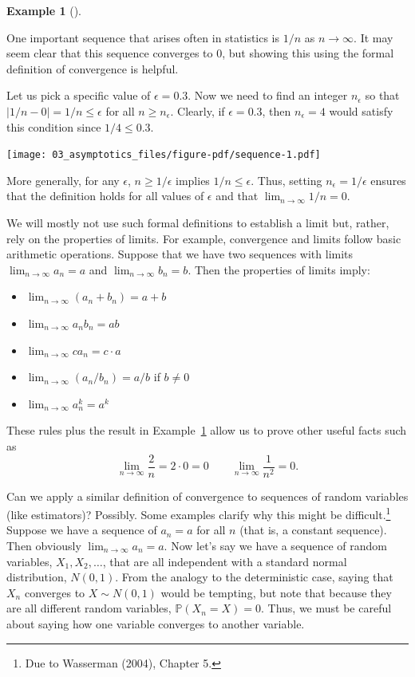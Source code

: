 \documentclass[
  letterpaper,
  DIV=11,
  numbers=noendperiod]{scrreprt}
\providecommand{\tightlist}{%
  \setlength{\itemsep}{0pt}\setlength{\parskip}{0pt}}\usepackage{longtable,booktabs,array}
\renewcommand{\P}{\mathbb{P}}
\theoremstyle{definition}
\newtheorem{example}{Example}[chapter]
\theoremstyle{definition}
\theoremstyle{plain}
\theoremstyle{remark}
\begin{document}
\begin{example}[]\protect\hypertarget{exm-limit}{}\label{exm-limit}

One important sequence that arises often in statistics is \(1/n\) as
\(n\to\infty\). It may seem clear that this sequence converges to 0, but
showing this using the formal definition of convergence is helpful.

Let us pick a specific value of \(\epsilon = 0.3\). Now we need to find
an integer \(n_{\epsilon}\) so that \(|1/n - 0| = 1/n \leq \epsilon\)
for all \(n \geq n_{\epsilon}\). Clearly, if \(\epsilon = 0.3\), then
\(n_{\epsilon} = 4\) would satisfy this condition since
\(1/4 \leq 0.3\).

\texttt{[image: 03\_asymptotics\_files/figure-pdf/sequence-1.pdf]}

More generally, for any \(\epsilon\), \(n \geq 1/\epsilon\) implies
\(1/n \leq \epsilon\). Thus, setting \(n_{\epsilon} = 1/\epsilon\)
ensures that the definition holds for all values of \(\epsilon\) and
that \(\lim_{n\to\infty} 1/n = 0\).

\end{example}

We will mostly not use such formal definitions to establish a limit but,
rather, rely on the properties of limits. For example, convergence and
limits follow basic arithmetic operations. Suppose that we have two
sequences with limits \(\lim_{n\to\infty} a_n = a\) and
\(\lim_{n\to\infty} b_n = b\). Then the properties of limits imply:

\begin{itemize}
\tightlist
\item
  \(\lim_{n\to\infty} (a_n + b_n) = a + b\)
\item
  \(\lim_{n\to\infty} a_nb_n = ab\)
\item
  \(\lim_{n\to\infty} ca_n = c\cdot a\)
\item
  \(\lim_{n\to\infty} (a_n/b_n) = a/b\) if \(b \neq 0\)
\item
  \(\lim_{n\to\infty} a_n^{k} = a^{k}\)
\end{itemize}

These rules plus the result in Example~\ref{exm-limit} allow us to prove
other useful facts such as \[
\lim_{n\to\infty} \frac{2}{n} = 2 \cdot 0 = 0 \qquad  \lim_{n\to\infty} \frac{1}{n^{2}} = 0.
\]

Can we apply a similar definition of convergence to sequences of random
variables (like estimators)? Possibly. Some examples clarify why this
might be difficult.\footnote{Due to Wasserman (2004), Chapter 5.}
Suppose we have a sequence of \(a_n = a\) for all \(n\) (that is, a
constant sequence). Then obviously
\(\lim_{n\rightarrow\infty} a_n = a\). Now let's say we have a sequence
of random variables, \(X_1, X_2, \ldots\), that are all independent with
a standard normal distribution, \(N(0,1)\). From the analogy to the
deterministic case, saying that \(X_n\) converges to \(X \sim N(0, 1)\)
would be tempting, but note that because they are all different random
variables, \(\P(X_n = X) = 0\). Thus, we must be careful about saying
how one variable converges to another variable.
\end{document}
